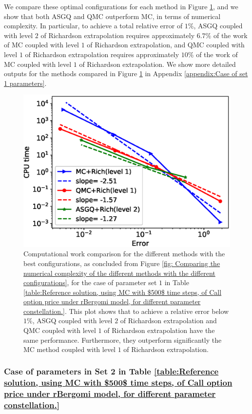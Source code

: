 We compare these optimal configurations for each method  in Figure \ref{fig:Complexity plot for  MISC for Case set $2$ parameters, comparison}, and we show that both ASGQ and QMC outperform MC, in terms of numerical complexity. In particular, to achieve a total relative error of $1\%$, ASGQ coupled with level $2$ of Richardson extrapolation requires
approximately $6.7\%$ of the work of MC coupled with level $1$ of Richardson extrapolation, and  QMC coupled with level $1$ of Richardson extrapolation requires approximately $10\%$ of the work of MC coupled with level $1$ of Richardson extrapolation. We show more detailed outputs for the methods compared in Figure \ref{fig:Complexity plot for  MISC for Case set $2$ parameters, comparison} in Appendix \ref{appendix:Case of set 1 parameters}.
\FloatBarrier
\begin{figure}[h!]
	\centering
	\includegraphics[width=0.4\linewidth]{./figures/rBergomi_Complexity_rates/set2/error_vs_time_set2_full_comparison}
	
	\caption{Computational work comparison for the different methods with the best configurations, as concluded from Figure \ref{fig: Comparing the numerical complexity of the different  methods with the different configurations}, for the case of parameter set $1$ in Table \ref{table:Reference solution, using MC with $500$ time steps, of Call option price under rBergomi model, for different parameter constellation.}. This plot shows that to achieve a relative error below $1\%$, ASGQ coupled with level $2$ of Richardson extrapolation and QMC coupled with level $1$ of  Richardson extrapolation have the same performance. Furthermore, they outperform significantly the MC method coupled with level $1$ of Richardson extrapolation.}
	\label{fig:Complexity plot for  MISC for Case set $2$ parameters, comparison}
\end{figure}
\FloatBarrier



\subsubsection{Case of parameters in Set 2  in Table \ref{table:Reference solution, using MC with $500$ time steps, of Call option price under rBergomi model, for different parameter constellation.} }\label{sec:Case of set 3 parameters}

